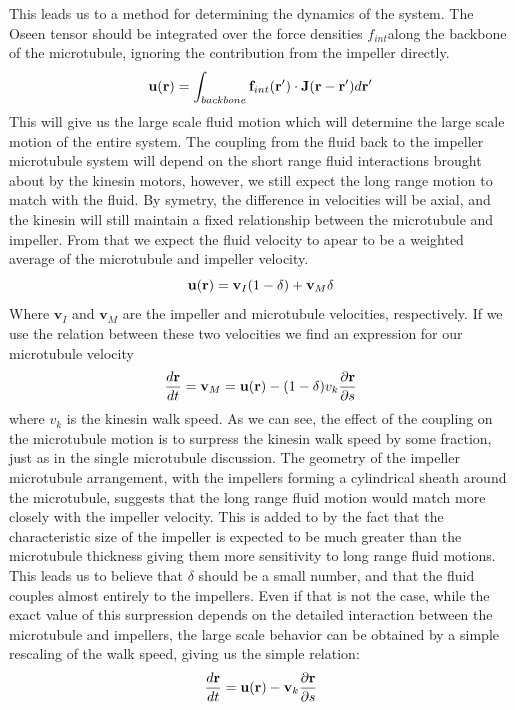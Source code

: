 \documentclass[11pt]{ucthesis}
\def\br{{\bf r}}
\begin{document}
{%
This leads us to a method for determining the dynamics of the system. The Oseen tensor should be integrated over the force densities $f_{int}$along the backbone of the microtubule, ignoring the contribution from the impeller directly. 
\begin{equation}
\label{eq:fluidvelocity}
\mathbf{u}(\br ) = \int_{backbone} \mathbf{f}_{int}(\br^\prime) \cdot \mathbf{J} (\br - \br^\prime) d\br^\prime
\end{equation}
This will give us the large scale fluid motion which will determine the large scale motion of the entire system. The coupling from the fluid back to the impeller microtubule system will depend on the short range fluid interactions brought about by the kinesin motors, however, we still expect the long range motion to match with the fluid. By symetry, the difference in velocities will be axial, and the kinesin will still maintain a fixed relationship between the microtubule and impeller. From that we expect the fluid velocity to apear to be a weighted average of the microtubule and impeller velocity.
\begin{equation}
\label{eq:systemvelocity}
\mathbf{u}(\br) = \mathbf{v}_I(1-\delta) + \mathbf{v}_M \delta
\end{equation}
Where $\mathbf{v}_I$ and $\mathbf{v}_M$ are the impeller and microtubule velocities, respectively. If we use the relation between these two velocities we find an expression for our microtubule velocity
\begin{equation}
\label{eq:mtubevelocity}
\frac{d \br}{dt} = \mathbf{v}_M = \mathbf{u}(\br) - (1-\delta)v_k \frac{\partial \br}{\partial s}
\end{equation}
where $v_k$ is the kinesin walk speed. As we can see, the effect of the coupling on the microtubule motion is to surpress the kinesin walk speed by some fraction, just as in the single microtubule discussion. 
The geometry of the impeller microtubule arrangement, with the impellers forming a cylindrical sheath around the microtubule, suggests that the long range fluid motion would match more closely with the impeller velocity. This is added to by the fact that the characteristic size of the impeller is expected to be much greater than the microtubule thickness giving them more sensitivity to long range fluid motions.
This leads us to believe that $\delta$ should be a small number, and that the fluid couples almost entirely to the impellers.
Even if that is not the case, while the exact value of this surpression depends on the detailed interaction between the microtubule and impellers, the large scale behavior can be obtained by a simple rescaling of the walk speed, giving us the simple relation:
\begin{equation}
\label{eq:backbonevelocity}
\frac{d \br}{dt} = \mathbf{u}(\br ) - \mathbf{v}_k \frac{\partial \br}{\partial s}
\end{equation}

}
\end{document}
